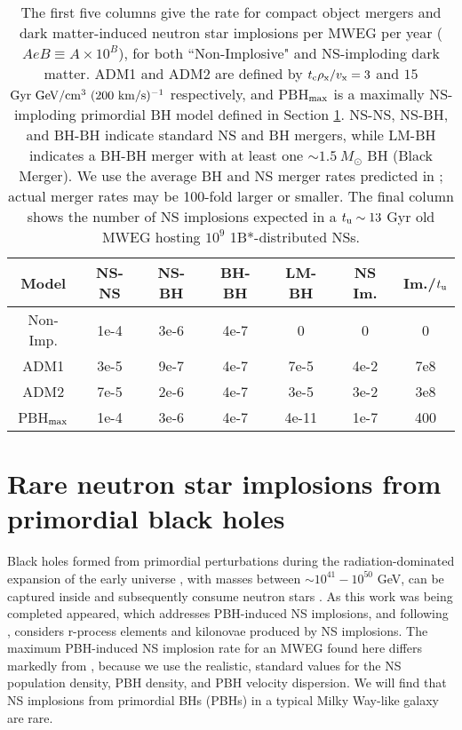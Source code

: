 \documentclass[nofootinbib,longbibliography,prd,floatfix,superscriptaddress,twocolumn]{revtex4-1}
\begin{document}
\begin{table}[h]
\begin{center}
\begin{tabular}{| c | c | c | c | c | c | c |}
\hline
Model &NS-NS&NS-BH&BH-BH&LM-BH&NS Im.&Im./$t_{\rm u}$\\ \hline \hline
Non-Imp. &1e-4&3e-6&4e-7&0&0&0 \\ \hline
ADM1 &3e-5&9e-7&4e-7&7e-5&4e-2&7e8\\ \hline
ADM2 &7e-5&2e-6&4e-7&3e-5&3e-2&3e8\\ \hline
PBH$_{\rm max}$ &1e-4&3e-6&4e-7&4e-11&1e-7&400   \\ \hline
\end{tabular}
\end{center}
\caption{The first five columns give the rate for compact object mergers and dark matter-induced neutron star implosions per MWEG per year ($AeB \equiv A \times 10^{B}$), for both ``Non-Implosive" and NS-imploding dark matter. ADM1 and ADM2 are defined by $t_{\rm c} \rho_{\rm x} /v_{\rm x}  = 3$ and $15$ $\rm Gyr~GeV/cm^3~ (200 ~km/s)^{-1}$ respectively, and PBH$_{\rm max}$ is a maximally NS-imploding primordial BH model defined in Section \ref{sec:nspbh}. NS-NS, NS-BH, and BH-BH indicate standard NS and BH mergers, while LM-BH indicates a BH-BH merger with at least one $\sim 1.5~M_{\odot}$ BH (Black Merger). We use the average BH and NS merger rates predicted in \cite{Abadie:2010cf}; actual merger rates may be 100-fold larger or smaller. The final column shows the number of NS implosions expected in a $t_{\rm u} \sim 13$ Gyr old MWEG hosting $10^9$ 1B*-distributed NSs.}
\label{tab:rates}
\end{table}

\section{Rare neutron star implosions from primordial black holes} 
\label{sec:nspbh}
Black holes formed from primordial perturbations during the radiation-dominated expansion of the early universe \cite{Hawking:1974rv,Carr:1974nx}, with masses between $\sim 10^{41} - 10^{50}$ GeV, can be captured inside and subsequently consume neutron stars \cite{Capela:2013yf,Capela:2012jz}. As this work was being completed \cite{Fuller:2017uyd} appeared, which addresses PBH-induced NS implosions, and following \cite{Bramante:2016mzo}, considers r-process elements and kilonovae produced by NS implosions. The maximum PBH-induced NS implosion rate for an MWEG found here differs markedly from \cite{Fuller:2017uyd}, because we use the realistic, standard values for the NS population density, PBH density, and PBH velocity dispersion. We will find that NS implosions from primordial BHs (PBHs) in a typical Milky Way-like galaxy are rare. 
\end{document}
